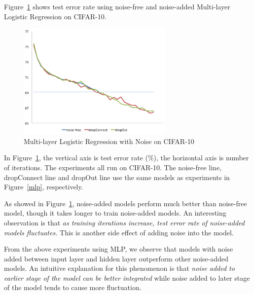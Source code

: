 Figure~\ref{mlp10} shows test error rate using noise-free and noise-added
Multi-layer Logistic Regression on CIFAR-10.
\begin{figure}
\centering
\includegraphics[width=215pt]{f-figs/mlp10.png}
\caption{Multi-layer Logistic Regression with Noise on CIFAR-10}
\label{mlp10}
\end{figure}
In Figure~\ref{mlp10}, the vertical axis is test error rate (\%), the
horizontal axis is number of iterations. The experiments all run on
CIFAR-10. The noise-free line, dropConnect line and dropOut line use
the same models as experiments in Figure~\ref{mlp}, respectively.

As showed in Figure~\ref{mlp10}, noise-added models perform much better than
noise-free model, though it takes longer to train noise-added models.
An interesting observation is that {\em as training iterations increase,
test error rate of noise-added models fluctuates.} This is another side
effect of adding noise into the model.

From the above experiments using MLP, we observe that models with noise added
between input layer and hidden layer outperform other noise-added models.
An intuitive explanation for this phenomenon is that {\em noise added to
earlier stage of the model can be better integrated} while noise added to
later stage of the model tends to cause more fluctuation.

